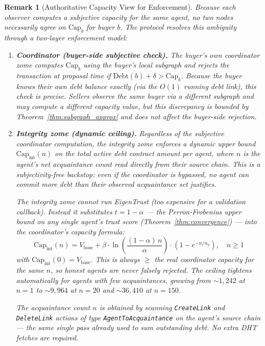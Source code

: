 \documentclass[11pt]{article}
\newtheorem{remark}[theorem]{Remark}
\begin{document}
\begin{remark}[Authoritative Capacity View for Enforcement]\label{rem:capacity_authority}
Because each observer computes a \emph{subjective} capacity for the same agent, no two nodes necessarily agree on $\text{Cap}_b$ for buyer $b$. The protocol resolves this ambiguity through a two-layer enforcement model:
\begin{enumerate}
    \item \textbf{Coordinator (buyer-side subjective check).} The buyer's own coordinator zome computes $\text{Cap}_b$ using the buyer's local subgraph and rejects the transaction at proposal time if $\text{Debt}(b) + \delta > \text{Cap}_b$. Because the buyer knows their own debt balance exactly (via the $O(1)$ running debt link), this check is precise. Sellers observe the same buyer via a different subgraph and may compute a different capacity value, but this discrepancy is bounded by Theorem~\ref{thm:subgraph_approx} and does not affect the buyer-side rejection.
    \item \textbf{Integrity zome (dynamic ceiling).} Regardless of the subjective coordinator computation, the integrity zome enforces a \emph{dynamic} upper bound $\text{Cap}_{\text{int}}(n)$ on the total active debt contract amount per agent, where $n$ is the agent's net acquaintance count read directly from their source chain. This is a subjectivity-free backstop: even if the coordinator is bypassed, no agent can commit more debt than their observed acquaintance set justifies.

    The integrity zome cannot run EigenTrust (too expensive for a validation callback). Instead it substitutes $t = 1 - \alpha$ — the Perron-Frobenius upper bound on any single agent's trust score (Theorem~\ref{thm:convergence}) — into the coordinator's capacity formula:
    \begin{equation}\label{eq:cap_integrity}
        \text{Cap}_{\text{int}}(n) = V_{\text{base}} + \beta \cdot \ln\!\left(\frac{(1-\alpha)\,n}{\alpha}\right) \cdot \left(1 - e^{-n/n_0}\right), \quad n \geq 1
    \end{equation}
    with $\text{Cap}_{\text{int}}(0) = V_{\text{base}}$. This is always $\geq$ the real coordinator capacity for the same $n$, so honest agents are never falsely rejected. The ceiling tightens automatically for agents with few acquaintances, growing from ${\sim}1{,}242$ at $n=1$ to ${\sim}9{,}964$ at $n=20$ and ${\sim}36{,}410$ at $n=150$.

    The acquaintance count $n$ is obtained by scanning \texttt{CreateLink} and \texttt{DeleteLink} actions of type \texttt{AgentToAcquaintance} on the agent's source chain — the same single pass already used to sum outstanding debt. No extra DHT fetches are required.


\end{enumerate}
\end{remark}
\end{document}
